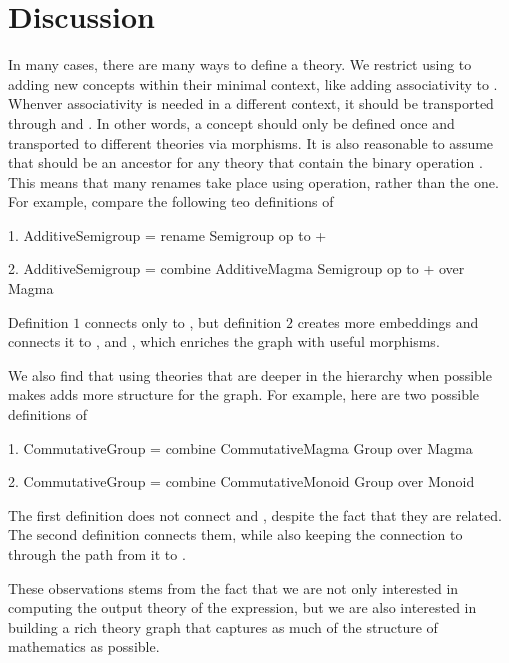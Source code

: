 \section{Discussion}
\label{sec:library:discussion}
In many cases, there are many ways to define a theory. We restrict using  to adding new concepts within their minimal context, like adding associativity to . Whenver associativity is needed in a different context, it should be transported through  and . In other words, a concept should only be defined once and transported to different theories via morphisms. It is also reasonable to assume that  should be an ancestor for any theory that contain the binary operation \lstmath{+}. This means that many renames take place using  operation, rather than the  one. For example, compare the following teo definitions of  
\begin{togcode}
1. AdditiveSemigroup = rename Semigroup {op to +}
\end{togcode}
\begin{togcode}
2. AdditiveSemigroup = 
       combine AdditiveMagma {} Semigroup {op to +} over Magma 
\end{togcode}
Definition $1$ connects  only to , but definition $2$ creates more embeddings and connects it to ,  and , which enriches the graph with useful morphisms. 

We also find that using theories that are deeper in the hierarchy when possible makes adds more structure for the graph. For example, here are two possible definitions of    
\begin{togcode} 
1. CommutativeGroup = 
       combine CommutativeMagma {} Group {} over Magma
\end{togcode} 
\begin{togcode}
2. CommutativeGroup = 
       combine CommutativeMonoid {} Group {} over Monoid
\end{togcode}
The first definition does not connect  and , despite the fact that they are related. The second definition connects them, while also keeping the connection to  through the path from it to . 

These observations stems from the fact that we are not only interested in computing the output theory of the expression, but we are also interested in building a rich theory graph that captures as much of the structure of mathematics as possible. 

